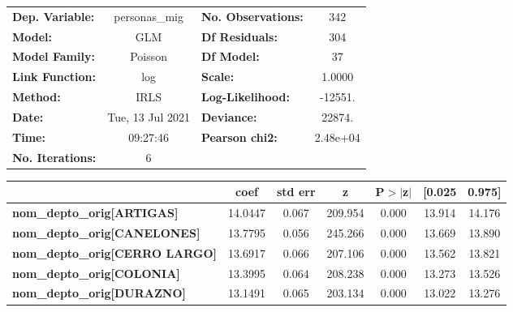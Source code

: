 \begin{center}
\begin{tabular}{lclc}
\toprule
\textbf{Dep. Variable:}                    &  personas\_mig   & \textbf{  No. Observations:  } &      342    \\
\textbf{Model:}                            &       GLM        & \textbf{  Df Residuals:      } &      304    \\
\textbf{Model Family:}                     &     Poisson      & \textbf{  Df Model:          } &       37    \\
\textbf{Link Function:}                    &       log        & \textbf{  Scale:             } &    1.0000   \\
\textbf{Method:}                           &       IRLS       & \textbf{  Log-Likelihood:    } &   -12551.   \\
\textbf{Date:}                             & Tue, 13 Jul 2021 & \textbf{  Deviance:          } &    22874.   \\
\textbf{Time:}                             &     09:27:46     & \textbf{  Pearson chi2:      } &  2.48e+04   \\
\textbf{No. Iterations:}                   &        6         & \textbf{                     } &             \\
\bottomrule
\end{tabular}
\begin{tabular}{lcccccc}
                                           & \textbf{coef} & \textbf{std err} & \textbf{z} & \textbf{P$> |$z$|$} & \textbf{[0.025} & \textbf{0.975]}  \\
\midrule
\textbf{nom\_depto\_orig[ARTIGAS]}         &      14.0447  &        0.067     &   209.954  &         0.000        &       13.914    &       14.176     \\
\textbf{nom\_depto\_orig[CANELONES]}       &      13.7795  &        0.056     &   245.266  &         0.000        &       13.669    &       13.890     \\
\textbf{nom\_depto\_orig[CERRO LARGO]}     &      13.6917  &        0.066     &   207.106  &         0.000        &       13.562    &       13.821     \\
\textbf{nom\_depto\_orig[COLONIA]}         &      13.3995  &        0.064     &   208.238  &         0.000        &       13.273    &       13.526     \\
\textbf{nom\_depto\_orig[DURAZNO]}         &      13.1491  &        0.065     &   203.134  &         0.000        &       13.022    &       13.276     \\

\end{tabular}
\end{center}
